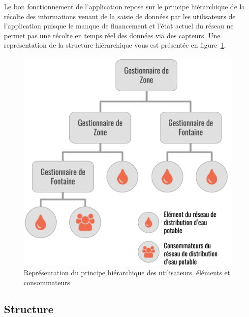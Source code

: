 \documentclass{EPL-master-thesis-covers-FR}
\begin{document}
			Le bon fonctionnement de l'application repose sur le principe hiérarchique de la récolte des informations venant de la saisie de données par les utilisateurs de l'application puisque le manque de financement et l'état actuel du réseau ne permet pas une récolte en temps réel des données via des capteurs. Une représentation de la structure hiérarchique vous est présentée en figure~\ref{fig:principe_hierarchique}.

			\begin{figure}[H]
				\centering
				\includegraphics[scale=0.45]{images/principe_hierarchique}
				\caption{Représentation du principe hiérarchique des utilisateurs, éléments et consommateurs}
				\label{fig:principe_hierarchique}
			\end{figure}

			\subsection*{Structure}

\end{document}
